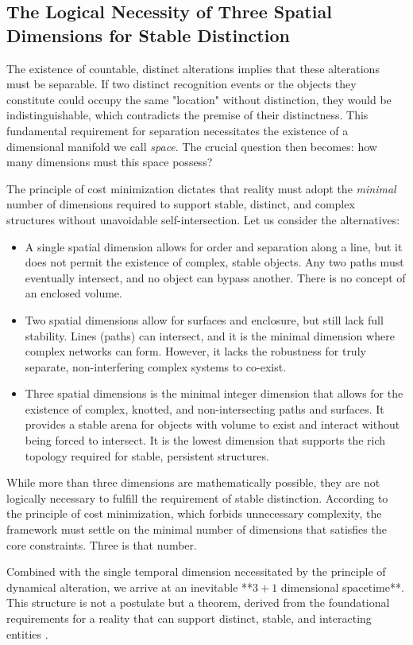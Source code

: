 \subsection{The Logical Necessity of Three Spatial Dimensions for Stable Distinction}
The existence of countable, distinct alterations implies that these alterations must be separable. If two distinct recognition events or the objects they constitute could occupy the same "location" without distinction, they would be indistinguishable, which contradicts the premise of their distinctness. This fundamental requirement for separation necessitates the existence of a dimensional manifold we call \emph{space}. The crucial question then becomes: how many dimensions must this space possess?

The principle of cost minimization dictates that reality must adopt the \emph{minimal} number of dimensions required to support stable, distinct, and complex structures without unavoidable self-intersection. Let us consider the alternatives:
\begin{itemize}
    \item A single spatial dimension allows for order and separation along a line, but it does not permit the existence of complex, stable objects. Any two paths must eventually intersect, and no object can bypass another. There is no concept of an enclosed volume.
    \item Two spatial dimensions allow for surfaces and enclosure, but still lack full stability. Lines (paths) can intersect, and it is the minimal dimension where complex networks can form. However, it lacks the robustness for truly separate, non-interfering complex systems to co-exist.
    \item Three spatial dimensions is the minimal integer dimension that allows for the existence of complex, knotted, and non-intersecting paths and surfaces. It provides a stable arena for objects with volume to exist and interact without being forced to intersect. It is the lowest dimension that supports the rich topology required for stable, persistent structures.
\end{itemize}
While more than three dimensions are mathematically possible, they are not logically necessary to fulfill the requirement of stable distinction. According to the principle of cost minimization, which forbids unnecessary complexity, the framework must settle on the minimal number of dimensions that satisfies the core constraints. Three is that number.

Combined with the single temporal dimension necessitated by the principle of dynamical alteration, we arrive at an inevitable **\(3+1\) dimensional spacetime**. This structure is not a postulate but a theorem, derived from the foundational requirements for a reality that can support distinct, stable, and interacting entities \cite{Tegmark1997}.

